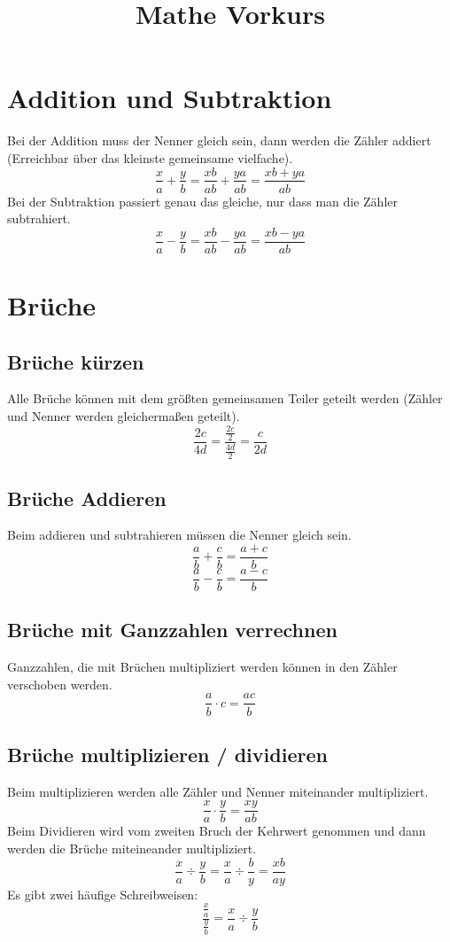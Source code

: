 \documentclass[11pt, a4paper]{article}
\begin{document}
\title{Mathe Vorkurs}
\maketitle

\thispagestyle{empty}


\tableofcontents

\newpage

\section{Addition und Subtraktion}
Bei der Addition muss der Nenner gleich sein, dann werden die Zähler addiert (Erreichbar über das kleinste gemeinsame vielfache).
\[
	\frac{x}{a} + \frac{y}{b} = \frac{xb}{ab} + \frac{ya}{ab} = \frac{xb+ya}{ab}
\]
Bei der Subtraktion passiert genau das gleiche, nur dass man die Zähler subtrahiert.
\[
	\frac{x}{a} - \frac{y}{b} = \frac{xb}{ab} - \frac{ya}{ab} = \frac{xb-ya}{ab}
\]

\section{Brüche}
\subsection{Brüche kürzen}
Alle Brüche können mit dem größten gemeinsamen Teiler geteilt werden (Zähler und Nenner werden gleichermaßen geteilt).
\[
	\frac{2c}{4d} = \frac{\frac{2c}{2}}{\frac{4d}{2}} = \frac{c}{2d}
\]

\subsection{Brüche Addieren}
Beim addieren und subtrahieren müssen die Nenner gleich sein.
\[
	\frac{a}{b} + \frac{c}{b} = \frac{a+c}{b}
\]
\[
	\frac{a}{b} - \frac{c}{b} = \frac{a-c}{b}
\]
\subsection{Brüche mit Ganzzahlen verrechnen}
Ganzzahlen, die mit Brüchen multipliziert werden können in den Zähler verschoben werden.
\[
	\frac{a}{b} \cdot c = \frac{ac}{b}
\]

\subsection{Brüche multiplizieren / dividieren}
Beim multiplizieren werden alle Zähler und Nenner miteinander multipliziert.
\[
	\frac{x}{a} \cdot \frac{y}{b} = \frac{xy}{ab}
\]
Beim Dividieren wird vom zweiten Bruch der Kehrwert genommen und dann werden die Brüche miteineander multipliziert.
\[
	\frac{x}{a} \div \frac{y}{b} = \frac{x}{a} \div \frac{b}{y} = \frac{xb}{ay}
\]
Es gibt zwei häufige Schreibweisen:
\[
	\frac{\frac{x}{a}}{\frac{y}{b}} = \frac{x}{a} \div \frac{y}{b}
\]
\end{document}
